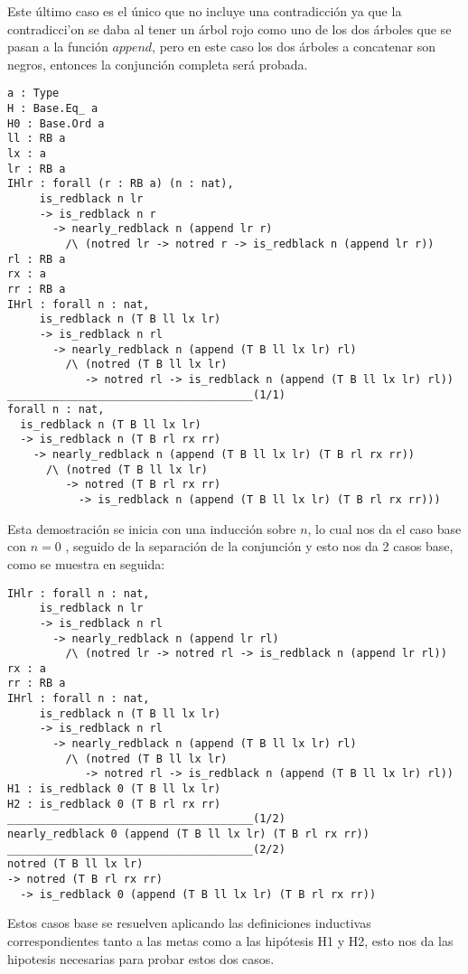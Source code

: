 Este \'ultimo caso es el \'unico que no incluye una contradicci\'on ya que la contradicci'on se
daba al tener un \'arbol rojo como uno de los dos \'arboles que se pasan a la funci\'on $append$,
pero en este caso los dos \'arboles a concatenar son negros, entonces la conjunci\'on completa
ser\'a probada.

\begin{verbatim}
a : Type
H : Base.Eq_ a
H0 : Base.Ord a
ll : RB a
lx : a
lr : RB a
IHlr : forall (r : RB a) (n : nat),
     is_redblack n lr
     -> is_redblack n r
       -> nearly_redblack n (append lr r)
         /\ (notred lr -> notred r -> is_redblack n (append lr r))
rl : RB a
rx : a
rr : RB a
IHrl : forall n : nat,
     is_redblack n (T B ll lx lr)
     -> is_redblack n rl
       -> nearly_redblack n (append (T B ll lx lr) rl)
         /\ (notred (T B ll lx lr)
            -> notred rl -> is_redblack n (append (T B ll lx lr) rl))
______________________________________(1/1)
forall n : nat,
  is_redblack n (T B ll lx lr)
  -> is_redblack n (T B rl rx rr)
    -> nearly_redblack n (append (T B ll lx lr) (T B rl rx rr))
      /\ (notred (T B ll lx lr)
         -> notred (T B rl rx rr)
           -> is_redblack n (append (T B ll lx lr) (T B rl rx rr)))
\end{verbatim}

Esta demostraci\'on se inicia con una inducci\'on sobre $n$, lo cual nos da el caso base con $n=0$
, seguido de la separaci\'on de la conjunci\'on y esto nos da 2 casos base, como se muestra en
seguida:

\begin{verbatim}
IHlr : forall n : nat,
     is_redblack n lr
     -> is_redblack n rl
       -> nearly_redblack n (append lr rl)
         /\ (notred lr -> notred rl -> is_redblack n (append lr rl))
rx : a
rr : RB a
IHrl : forall n : nat,
     is_redblack n (T B ll lx lr)
     -> is_redblack n rl
       -> nearly_redblack n (append (T B ll lx lr) rl)
         /\ (notred (T B ll lx lr)
            -> notred rl -> is_redblack n (append (T B ll lx lr) rl))
H1 : is_redblack 0 (T B ll lx lr)
H2 : is_redblack 0 (T B rl rx rr)
______________________________________(1/2)
nearly_redblack 0 (append (T B ll lx lr) (T B rl rx rr))
______________________________________(2/2)
notred (T B ll lx lr)
-> notred (T B rl rx rr)
  -> is_redblack 0 (append (T B ll lx lr) (T B rl rx rr))
\end{verbatim}

Estos casos base se resuelven aplicando las definiciones inductivas correspondientes tanto a las
metas como a las hip\'otesis H1 y H2, esto nos da las hipotesis necesarias para probar estos dos
casos.

